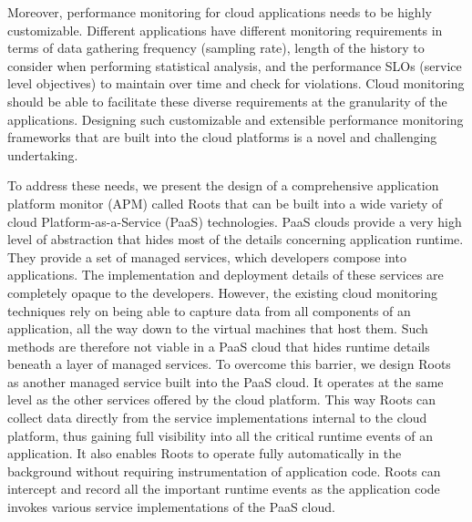 Moreover, performance monitoring for cloud applications needs to be highly customizable. Different
applications have different monitoring requirements in terms of data gathering frequency (sampling rate), 
length of the history to consider when performing statistical analysis, and the performance 
SLOs (service level objectives) to maintain over time and check for violations. Cloud monitoring
should be able to facilitate these diverse requirements at the granularity of the applications.
Designing such customizable and extensible performance
monitoring frameworks that are built into the cloud platforms is a novel and challenging undertaking.

To address these needs, we present the design of  a comprehensive application platform 
monitor (APM) called Roots that can be built into a wide variety of cloud Platform-as-a-Service (PaaS) technologies. 
PaaS clouds provide a very high level of abstraction that hides most of the details concerning application
runtime. They provide a set of managed services, which developers compose into applications.
The implementation and deployment details of these services are completely opaque to the developers. 
However, the existing cloud monitoring techniques rely on being able to capture data from all components 
of an application, all the way down to the virtual machines that host them. Such methods are
therefore not viable in a PaaS cloud that hides runtime details beneath a layer of managed services.
To overcome this barrier, we design Roots as another managed service built into the PaaS cloud.
It operates at the same level as the other services offered by the cloud platform. This way Roots can collect data
directly from the service implementations internal to the cloud platform, thus gaining full visibility into all the 
critical runtime events of an application. It also enables Roots to operate fully automatically in the background without
requiring instrumentation of application code. Roots can intercept and record all the important runtime events as the
application code invokes various service implementations of the PaaS cloud.


